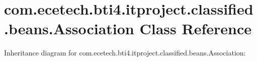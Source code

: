 \hypertarget{classcom_1_1ecetech_1_1bti4_1_1itproject_1_1classified_1_1beans_1_1_association}{}\section{com.\+ecetech.\+bti4.\+itproject.\+classified.\+beans.\+Association Class Reference}
\label{classcom_1_1ecetech_1_1bti4_1_1itproject_1_1classified_1_1beans_1_1_association}


Inheritance diagram for com.\+ecetech.\+bti4.\+itproject.\+classified.\+beans.\+Association\+:
